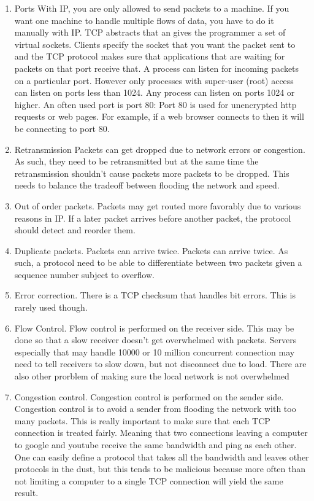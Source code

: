 \begin{enumerate}
  \item \gls{Ports}
  With IP, you are only allowed to send packets to a machine.
  If you want one machine to handle multiple flows of data, you have to do it manually with IP.
  TCP abstracts that an gives the programmer a set of virtual sockets.
  Clients specify the socket that you want the packet sent to and the TCP protocol makes sure that applications that are waiting for packets on that port receive that.
  A process can listen for incoming packets on a particular port.
  However only processes with \gls{super-user} (root) access can listen on ports less than 1024.
  Any process can listen on ports 1024 or higher.
  An often used port is port 80: Port 80 is used for unencrypted http requests or web pages.
  For example, if a web browser connects to  then it will be connecting to port 80.

\item \gls{Retransmission}
  Packets can get dropped due to network errors or congestion.
  As such, they need to be retransmitted but at the same time the retransmission shouldn't cause packets more packets to be dropped.
  This needs to balance the tradeoff between flooding the network and speed.

\item Out of order packets.
  Packets may get routed more favorably due to various reasons in IP.
  If a later packet arrives before another packet, the protocol should detect and reorder them.

\item Duplicate packets.
  Packets can arrive twice.
  Packets can arrive twice.
  As such, a protocol need to be able to differentiate between two packets given a sequence number subject to overflow.

\item Error correction.
  There is a TCP checksum that handles bit errors.
  This is rarely used though.

\item Flow Control.
  Flow control is performed on the receiver side.
  This may be done so that a slow receiver doesn't get overwhelmed with packets.
  Servers especially that may handle 10000 or 10 million concurrent connection may need to tell receivers to slow down, but not disconnect due to load.
  There are also other prorblem of making sure the local network is not overwhelmed

\item Congestion control.
  Congestion control is performed on the sender side.
  Congestion control is to avoid a sender from flooding the network with too many packets.
  This is really important to make sure that each TCP connection is treated fairly.
  Meaning that two connections leaving a computer to google and youtube receive the same bandwidth and ping as each other.
  One can easily define a protocol that takes all the bandwidth and leaves other protocols in the dust, but this tends to be malicious because more often than not limiting a computer to a single TCP connection will yield the same result.


\end{enumerate}
